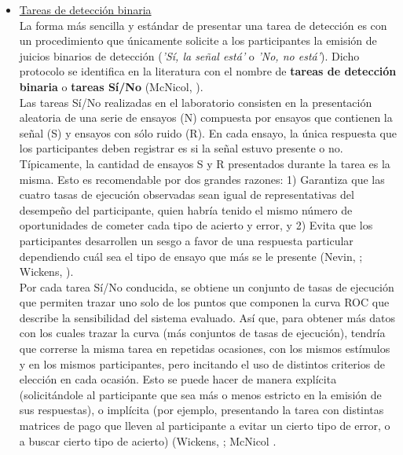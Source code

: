 \begin{itemize}
\item \underline{Tareas de detección binaria}\\

La forma más sencilla y estándar de presentar una tarea de detección es con un procedimiento que únicamente solicite a los participantes la emisión de juicios binarios de detección (\textit{'Sí, la señal está'} o \textit{'No, no está'}). Dicho protocolo se identifica en la literatura con el nombre de \textbf{tareas de detección binaria} o \textbf{tareas Sí/No} (McNicol, \citeyear{McNicol2}).\\

Las tareas Sí/No realizadas en el laboratorio consisten en la presentación aleatoria de una serie de ensayos (N) compuesta por ensayos que contienen la señal (S) y ensayos con sólo ruido (R). En cada ensayo, la única respuesta que los participantes deben registrar es si la señal estuvo presente o no.\\

Típicamente, la cantidad de ensayos S y R presentados durante la tarea es la misma. Esto es recomendable por dos grandes razones: 1) Garantiza que las cuatro tasas de ejecución observadas sean igual de representativas del desempeño del participante, quien habría tenido el mismo número de oportunidades de cometer cada tipo de acierto y error, y 2) Evita que los participantes desarrollen un sesgo a favor de una respuesta particular dependiendo cuál sea el tipo de ensayo que más se le presente (Nevin, \citeyear{Nevin1969}; Wickens, \citeyear{Wickens1}).\\

Por cada tarea Sí/No conducida, se obtiene un conjunto de tasas de ejecución que permiten trazar uno solo de los puntos que componen la curva ROC que describe la sensibilidad del sistema evaluado. Así que, para obtener más datos con los cuales trazar la curva (más conjuntos de tasas de ejecución), tendría que correrse la misma tarea en repetidas ocasiones, con los mismos estímulos y en los mismos participantes, pero incitando el uso de distintos criterios de elección en cada ocasión. Esto se puede hacer de manera explícita (solicitándole al participante que sea más o menos estricto en la emisión de sus respuestas), o implícita (por ejemplo, presentando la tarea con distintas matrices de pago que lleven al participante a evitar un cierto tipo de error, o a buscar cierto tipo de acierto) (Wickens, \citeyear{Wickens1}; McNicol \citeyear{McNicol2}.\\


\end{itemize}
